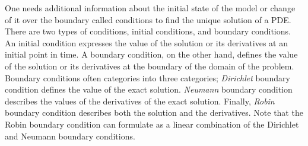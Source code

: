 One needs additional information about the initial state of the model or change of it over the boundary called conditions to find the unique solution of a PDE. There are two types of conditions, initial conditions, and boundary conditions. An initial condition expresses the value of the solution or its derivatives at an initial point in time. A boundary condition, on the other hand, defines the value of the solution or its derivatives at the boundary of the domain of the problem. Boundary conditions often categories into three categories; \textit{Dirichlet} boundary condition defines the value of the exact solution.  \textit{Neumann} boundary condition describes the values of the derivatives of the exact solution. Finally, \textit{Robin} boundary condition describes both the solution and the derivatives. Note that the Robin boundary condition can formulate as a linear combination of the Dirichlet and Neumann boundary conditions. 
